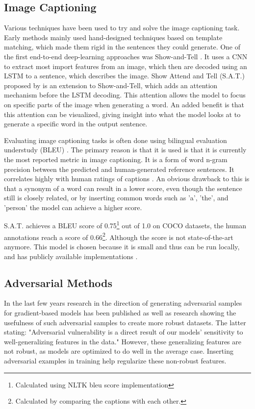 \subsection*{Image Captioning}
Various techniques have been used to try and solve the image captioning task. Early methods mainly used hand-designed techniques based on template matching, which made them rigid in the sentences they could generate. One of the first end-to-end deep-learning approaches was Show-and-Tell \cite{showandtell}. It uses a CNN to extract most import features from an image, which then are decoded using an LSTM \cite{lstm} to a sentence, which describes the image.
Show Attend and Tell (S.A.T.) proposed by \citeauthor{xu2016show} is an extension to Show-and-Tell, which adds an attention mechanism before the LSTM decoding. This attention allows the model to focus on specific parts of the image when generating a word. An added benefit is that this attention can be visualized, giving insight into what the model looks at to generate a specific word in the output sentence.

Evaluating image captioning tasks is often done using bilingual evaluation understudy (BLEU) \cite{papineni_roukos_ward_zhu_2001}. The primary reason is that it is used is that it is currently the most reported metric in image captioning. It is a form of word n-gram precision between the predicted and human-generated reference sentences. It correlates highly with human ratings of captions \cite{showandtell}. An obvious drawback to this is that a synonym of a word can result in a lower score, even though the sentence still is closely related, or by inserting common words such as 'a', 'the', and 'person' the model can achieve a higher score.

S.A.T. achieves a BLEU score of 0.75\footnote[1]{Calculated using NLTK\cite{nltk} bleu score implementation} out of 1.0 on COCO\cite{lin2015microsoft} datasets, the human annotations reach a score of 0.66\footnote[2]{Calculated by comparing the captions with each other.}. Although the score is not state-of-the-art\cite{DBLP:journals/corr/abs-2107-06912} anymore. This model is chosen because it is small and thus can be run locally, and has publicly available implementations \cite{sgrvinod}.

\subsection*{Adversarial Methods}
In the last few years research in the direction of generating adversarial samples for gradient-based models has been published \cite{goodfellow2015explaining,Kurakin} as well as research showing the usefulness of such adversarial samples\cite{Ilyas2019features} to create more robust datasets. The latter stating: "Adversarial vulnerability is a direct result of our models' sensitivity to well-generalizing features in the data." However, these generalizing features are not robust, as models are optimized to do well in the average case. Inserting adversarial examples in training help regularize these non-robust features\cite{https://doi.org/10.48550/arxiv.1611.01236}.

